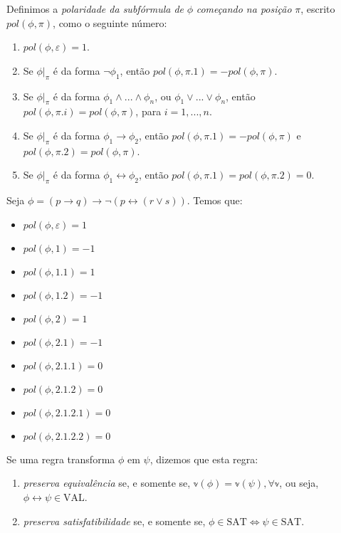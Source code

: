 \begin{definition}
    Definimos a \emph{polaridade da subfórmula de} $\phi$ \emph{começando na posição} $\pi$, escrito $pol(\phi,\pi)$, como o seguinte número:
    \begin{enumerate}
        \item $pol(\phi,\varepsilon) = 1$.
        \item Se $\phi|_\pi$ é da forma $\neg \phi_1$, então $pol(\phi,\pi.1) = -pol(\phi,\pi)$.
        \item Se $\phi|_\pi$ é da forma $\phi_1 \wedge ... \wedge \phi_n$, ou $\phi_1 \vee ... \vee \phi_n$, então $pol(\phi,\pi.i) = pol(\phi,\pi)$, para $i=1,...,n$.
        \item Se $\phi|_\pi$ é da forma $\phi_1 \rightarrow \phi_2$, então $pol(\phi,\pi.1) = -pol(\phi,\pi)$ e $pol(\phi,\pi.2) = pol(\phi,\pi)$.
        \item Se $\phi|_\pi$ é da forma $\phi_1 \leftrightarrow \phi_2$, então $pol(\phi,\pi.1) = pol(\phi,\pi.2) = 0$.
    \end{enumerate}
\end{definition}

\begin{example}
    Seja $\phi = (p \rightarrow q) \rightarrow \neg(p \leftrightarrow (r \vee s))$. Temos que:
    \begin{itemize}
        \item $pol(\phi,\varepsilon) = 1$
        \item $pol(\phi,1) = -1$
        \item $pol(\phi,1.1) = 1$
        \item $pol(\phi,1.2) = -1$
        \item $pol(\phi,2) = 1$
        \item $pol(\phi,2.1) = -1$
        \item $pol(\phi,2.1.1) = 0$
        \item $pol(\phi,2.1.2) = 0$
        \item $pol(\phi,2.1.2.1) = 0$
        \item $pol(\phi,2.1.2.2) = 0$
    \end{itemize}
\end{example}

\begin{definition}
	Se uma regra transforma $\phi$ em $\psi$, dizemos que esta regra:
	\begin{enumerate}
		\item \emph{preserva equivalência} se, e somente se, $\mathbb{v}(\phi) = \mathbb{v}(\psi), \forall \mathbb{v}$, ou seja, $\phi \leftrightarrow \psi \in \text{VAL}$.
		\item \emph{preserva satisfatibilidade} se, e somente se, $\phi \in \text{SAT} \iff \psi \in \text{SAT}$.
	\end{enumerate}
\end{definition}

